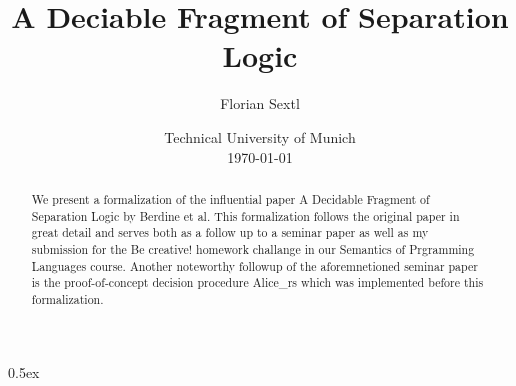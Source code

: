 \documentclass[11pt,a4paper]{article}
\begin{document}
\title{A Deciable Fragment of Separation Logic}
\author{Florian Sextl}
\date{Technical University of Munich\\[\baselineskip] \today}
\maketitle

\begin{abstract}
  We present a formalization of the influential paper A Decidable Fragment of
  Separation Logic \cite{JoshBerdine.2004} by Berdine et al.
  This formalization follows the original paper in great detail and serves both
  as a follow up to a seminar paper \cite{seminar-paper} as well as my submission
  for the Be creative! homework challange in our Semantics of Prgramming Languages
  course.
  Another noteworthy followup of the aforemnetioned seminar paper is the proof-of-concept
  decision procedure Alice\_rs \cite{Alice-rs} which was implemented before this formalization.
\end{abstract}

\tableofcontents

\pagebreak

\parindent 0pt\parskip 0.5ex



%


\end{document}
